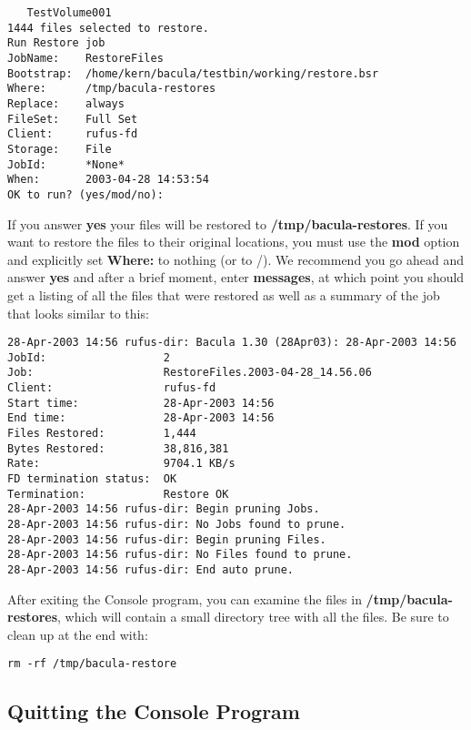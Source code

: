 {{\begin{verbatim}
   TestVolume001
1444 files selected to restore.
Run Restore job
JobName:    RestoreFiles
Bootstrap:  /home/kern/bacula/testbin/working/restore.bsr
Where:      /tmp/bacula-restores
Replace:    always
FileSet:    Full Set
Client:     rufus-fd
Storage:    File
JobId:      *None*
When:       2003-04-28 14:53:54
OK to run? (yes/mod/no):
\end{verbatim}
\normalsize

If you answer {\bf yes} your files will be restored to {\bf
/tmp/bacula-restores}. If you want to restore the files to their original
locations, you must use the {\bf mod} option and explicitly set {\bf Where:}
to nothing (or to /). We recommend you go ahead and answer {\bf yes} and after
a brief moment, enter {\bf messages}, at which point you should get a listing
of all the files that were restored as well as a summary of the job that looks
similar to this: 

\footnotesize
\begin{verbatim}
28-Apr-2003 14:56 rufus-dir: Bacula 1.30 (28Apr03): 28-Apr-2003 14:56
JobId:                  2
Job:                    RestoreFiles.2003-04-28_14.56.06
Client:                 rufus-fd
Start time:             28-Apr-2003 14:56
End time:               28-Apr-2003 14:56
Files Restored:         1,444
Bytes Restored:         38,816,381
Rate:                   9704.1 KB/s
FD termination status:  OK
Termination:            Restore OK
28-Apr-2003 14:56 rufus-dir: Begin pruning Jobs.
28-Apr-2003 14:56 rufus-dir: No Jobs found to prune.
28-Apr-2003 14:56 rufus-dir: Begin pruning Files.
28-Apr-2003 14:56 rufus-dir: No Files found to prune.
28-Apr-2003 14:56 rufus-dir: End auto prune.
\end{verbatim}
\normalsize

After exiting the Console program, you can examine the files in {\bf
/tmp/bacula-restores}, which will contain a small directory tree with all the
files. Be sure to clean up at the end with: 

\footnotesize
\begin{verbatim}
rm -rf /tmp/bacula-restore
\end{verbatim}
\normalsize

\subsection*{Quitting the Console Program}

}}
